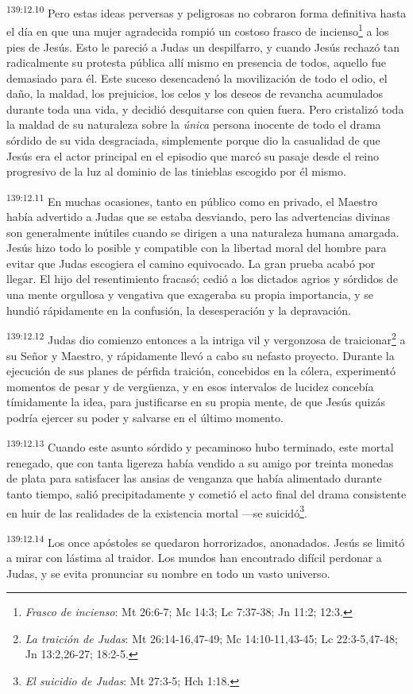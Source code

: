\par 
\textsuperscript{139:12.10} Pero estas ideas perversas y peligrosas no cobraron forma definitiva hasta el día en que una mujer agradecida rompió un costoso frasco de incienso\footnote{\textit{Frasco de incienso}: Mt 26:6-7; Mc 14:3; Lc 7:37-38; Jn 11:2; 12:3.} a los pies de Jesús. Esto le pareció a Judas un despilfarro, y cuando Jesús rechazó tan radicalmente su protesta pública allí mismo en presencia de todos, aquello fue demasiado para él. Este suceso desencadenó la movilización de todo el odio, el daño, la maldad, los prejuicios, los celos y los deseos de revancha acumulados durante toda una vida, y decidió desquitarse con quien fuera. Pero cristalizó toda la maldad de su naturaleza sobre la \textit{única} persona inocente de todo el drama sórdido de su vida desgraciada, simplemente porque dio la casualidad de que Jesús era el actor principal en el episodio que marcó su pasaje desde el reino progresivo de la luz al dominio de las tinieblas escogido por él mismo.

\par 
\textsuperscript{139:12.11} En muchas ocasiones, tanto en público como en privado, el Maestro había advertido a Judas que se estaba desviando, pero las advertencias divinas son generalmente inútiles cuando se dirigen a una naturaleza humana amargada. Jesús hizo todo lo posible y compatible con la libertad moral del hombre para evitar que Judas escogiera el camino equivocado. La gran prueba acabó por llegar. El hijo del resentimiento fracasó; cedió a los dictados agrios y sórdidos de una mente orgullosa y vengativa que exageraba su propia importancia, y se hundió rápidamente en la confusión, la desesperación y la depravación.

\par 
\textsuperscript{139:12.12} Judas dio comienzo entonces a la intriga vil y vergonzosa de traicionar\footnote{\textit{La traición de Judas}: Mt 26:14-16,47-49; Mc 14:10-11,43-45; Lc 22:3-5,47-48; Jn 13:2,26-27; 18:2-5.} a su Señor y Maestro, y rápidamente llevó a cabo su nefasto proyecto. Durante la ejecución de sus planes de pérfida traición, concebidos en la cólera, experimentó momentos de pesar y de verg\"uenza, y en esos intervalos de lucidez concebía tímidamente la idea, para justificarse en su propia mente, de que Jesús quizás podría ejercer su poder y salvarse en el último momento.

\par 
\textsuperscript{139:12.13} Cuando este asunto sórdido y pecaminoso hubo terminado, este mortal renegado, que con tanta ligereza había vendido a su amigo por treinta monedas de plata para satisfacer las ansias de venganza que había alimentado durante tanto tiempo, salió precipitadamente y cometió el acto final del drama consistente en huir de las realidades de la existencia mortal ---se suicidó\footnote{\textit{El suicidio de Judas}: Mt 27:3-5; Hch 1:18.}.

\par 
\textsuperscript{139:12.14} Los once apóstoles se quedaron horrorizados, anonadados. Jesús se limitó a mirar con lástima al traidor. Los mundos han encontrado difícil perdonar a Judas, y se evita pronunciar su nombre en todo un vasto universo.